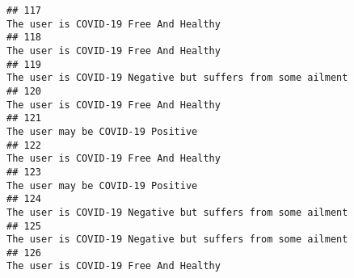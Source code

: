 \documentclass[
]{article}
\begin{document}
\begin{verbatim}
## 117                                                                                                                                                                                                                              The user is COVID-19 Free And Healthy
## 118                                                                                                                                                                                                                              The user is COVID-19 Free And Healthy
## 119                                                                                                                                                                                                        The user is COVID-19 Negative but suffers from some ailment
## 120                                                                                                                                                                                                                              The user is COVID-19 Free And Healthy
## 121                                                                                                                                                                                                                                  The user may be COVID-19 Positive
## 122                                                                                                                                                                                                                              The user is COVID-19 Free And Healthy
## 123                                                                                                                                                                                                                                  The user may be COVID-19 Positive
## 124                                                                                                                                                                                                        The user is COVID-19 Negative but suffers from some ailment
## 125                                                                                                                                                                                                        The user is COVID-19 Negative but suffers from some ailment
## 126                                                                                                                                                                                                                              The user is COVID-19 Free And Healthy

\end{verbatim}
\end{document}
